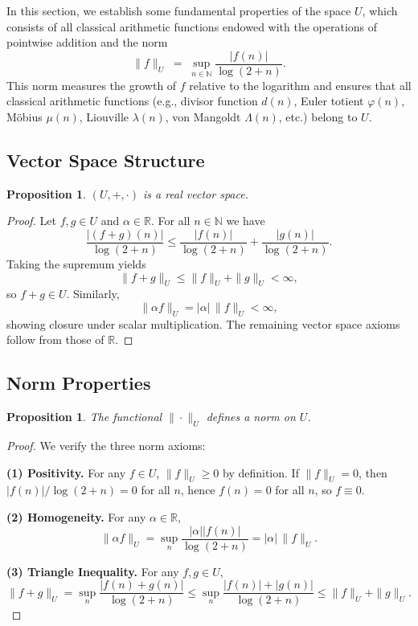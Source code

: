 \documentclass[11pt,a4paper]{article}
\theoremstyle{plain}
\newtheorem{proposition}[theorem]{Proposition}
\theoremstyle{definition}
\theoremstyle{remark}
\begin{document}
In this section, we establish some fundamental properties of the space $U$,
which consists of all classical arithmetic functions endowed with the
operations of pointwise addition and the norm
\[
\|f\|_{U} \;=\; \sup_{n\in\mathbb{N}} \frac{|f(n)|}{\log(2+n)}.
\]
This norm measures the growth of $f$ relative to the logarithm and ensures
that all classical arithmetic functions (e.g., divisor function $d(n)$,
Euler totient $\varphi(n)$, Möbius $\mu(n)$, Liouville $\lambda(n)$,
von Mangoldt $\Lambda(n)$, etc.) belong to $U$.

\subsection{Vector Space Structure}
\begin{proposition}
	$(U,+,\cdot)$ is a real vector space.
\end{proposition}

\begin{proof}
	Let $f,g\in U$ and $\alpha\in \mathbb{R}$.
	For all $n\in\mathbb{N}$ we have
	\[
	\frac{|(f+g)(n)|}{\log(2+n)}
	\leq \frac{|f(n)|}{\log(2+n)} + \frac{|g(n)|}{\log(2+n)}.
	\]
	Taking the supremum yields
	\[
	\|f+g\|_{U} \le \|f\|_{U} + \|g\|_{U} < \infty,
	\]
	so $f+g\in U$. Similarly,
	\[
	\|\alpha f\|_{U} = |\alpha|\,\|f\|_{U}<\infty,
	\]
	showing closure under scalar multiplication.
	The remaining vector space axioms follow from those of $\mathbb{R}$.
\end{proof}

\subsection{Norm Properties}
\begin{proposition}
	The functional $\|\cdot\|_{U}$ defines a norm on $U$.
\end{proposition}

\begin{proof}
	We verify the three norm axioms:
	
	\textbf{(1) Positivity.}
	For any $f\in U$, $\|f\|_{U}\ge0$ by definition.
	If $\|f\|_{U}=0$, then $|f(n)|/\log(2+n)=0$ for all $n$,
	hence $f(n)=0$ for all $n$, so $f\equiv 0$.
	
	\textbf{(2) Homogeneity.}
	For any $\alpha\in\mathbb{R}$,
	\[
	\|\alpha f\|_{U}
	= \sup_{n}\frac{|\alpha||f(n)|}{\log(2+n)}
	= |\alpha|\,\|f\|_{U}.
	\]
	
	\textbf{(3) Triangle Inequality.}
	For any $f,g\in U$,
	\[
	\|f+g\|_{U}
	= \sup_{n}\frac{|f(n)+g(n)|}{\log(2+n)}
	\le \sup_{n}\frac{|f(n)|+|g(n)|}{\log(2+n)}
	\le \|f\|_{U}+\|g\|_{U}.
	\]
\end{proof}
\end{document}
